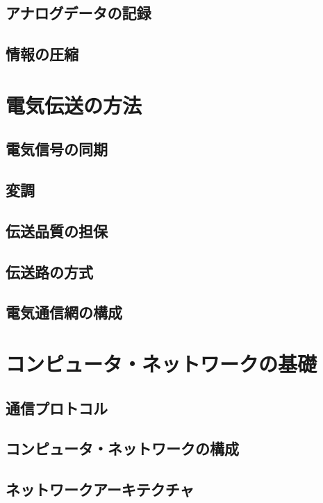 \documentclass[a4j,12pt]{jreport}
\begin{document}
\chapter{アナログデータの記録}

\chapter{情報の圧縮}


\part{電気伝送の方法}

\chapter{電気信号の同期}

\chapter{変調}

\chapter{伝送品質の担保}

\chapter{伝送路の方式}

\chapter{電気通信網の構成}


\part{コンピュータ・ネットワークの基礎}

\chapter{通信プロトコル}

\chapter{コンピュータ・ネットワークの構成}

\chapter{ネットワークアーキテクチャ}
\end{document}
